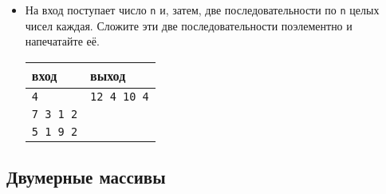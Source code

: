 \documentclass{article}
\begin{document}
\begin{itemize}
\item На вход поступает число \texttt{n} и, затем, две последовательности по \texttt{n} целых чисел каждая. Сложите эти две последовательности поэлементно и напечатайте её.
\begin{center}
\begin{tabular}{ l | l }
 вход & выход \\ \hline
 \texttt{4} & \texttt{12 4 10 4}  \\ 
 \texttt{7 3 1 2} &  \\ 
 \texttt{5 1 9 2} &  \\ 
\end{tabular}
\end{center}
\end{itemize}


\subsection*{Двумерные массивы}
\end{document}

